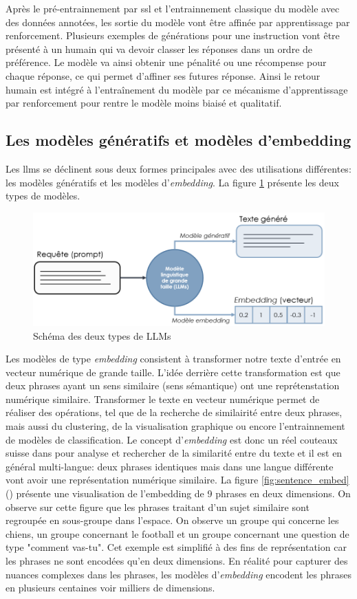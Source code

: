 Après le pré-entrainnement par \gls{ssl} et l'entrainnement classique du modèle avec des données annotées, les sortie du modèle vont être affinée par apprentissage par renforcement. Plusieurs exemples de générations pour une instruction vont être présenté à un humain qui va devoir classer les réponses dans un ordre de préférence. Le modèle va ainsi obtenir une pénalité ou une récompense pour chaque réponse, ce qui permet d'affiner ses futures réponse. Ainsi le retour humain est intégré à l'entraînement du modèle par ce mécanisme d'apprentissage par renforcement pour rentre le modèle moins biaisé et qualitatif.

\subsection{Les modèles génératifs et modèles d'embedding}
Les \gls{llms} se déclinent sous deux formes principales avec des utilisations différentes: les modèles génératifs et les modèles d'\textit{embedding}. La figure \ref{fig:llm-type} présente les deux types de modèles.
\begin{figure}[!htbp]
 \centering
 \includegraphics[width=1\textwidth]{figures/two_llm.png}
 \caption[Schéma des deux types de LLMs]{Schéma des deux types de LLMs}
 \label{fig:llm-type}
\end{figure}
Les modèles de type \textit{embedding} consistent à transformer notre texte d'entrée en vecteur numérique de grande taille. L'idée derrière cette transformation est que deux phrases ayant un sens similaire (sens sémantique) ont une reprétenstation numérique similaire. Transformer le texte en vecteur numérique permet de réaliser des opérations, tel que de la recherche de similairité entre deux phrases, mais aussi du clustering, de la visualisation graphique ou encore l'entrainnement de modèles de classification. Le concept d'\textit{embedding} est donc un réel couteaux suisse dans pour analyse et rechercher de la similarité entre du texte et il est en général multi-langue: deux phrases identiques mais dans une langue différente vont avoir une représentation numérique similaire. La figure \ref{fig:sentence_embed}  (\cite{luis_serrano_what_2023}) présente une visualisation de l'embedding de 9 phrases en deux dimensions. On observe sur cette figure que les phrases traitant d'un sujet similaire sont regroupée en sous-groupe dans l'espace. On observe un groupe qui concerne les chiens, un groupe concernant le football et un groupe concernant une question de type "comment vas-tu". Cet exemple est simplifié à des fins de représentation car les phrases ne sont encodées qu'en deux dimensions. En réalité pour capturer des nuances complexes dans les phrases, les modèles d'\textit{embedding} encodent les phrases en plusieurs centaines voir milliers de dimensions.
